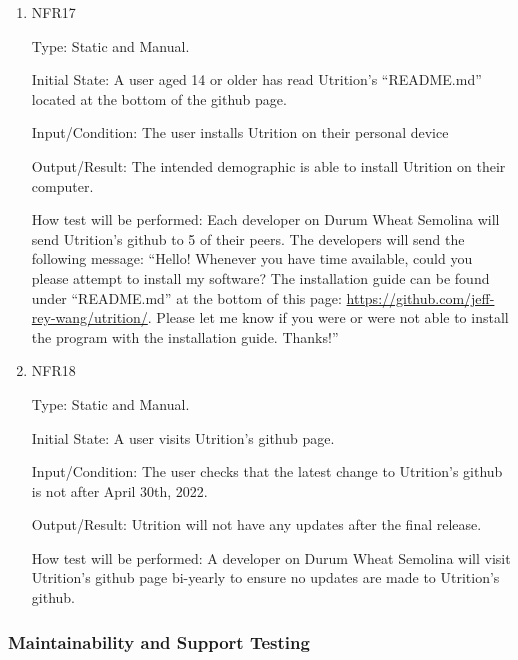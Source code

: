 \documentclass[12pt, titlepage]{article}
\begin{document}
\begin{enumerate}

\item{NFR17\\} 

Type: Static and Manual.

Initial State: A user aged 14 or older has read Utrition’s “README.md” located at the bottom of the github page.

Input/Condition: The user installs Utrition on their personal device

Output/Result: The intended demographic is able to install Utrition on their computer.

How test will be performed: Each developer on Durum Wheat Semolina will send Utrition’s github to 5 of their peers. The developers will send the following message: “Hello! Whenever you have time available, could you please attempt to install my software? The installation guide can be found under “README.md” at the bottom of this page: \href{https://github.com/jeff-rey-wang/utrition/}{https://github.com/jeff-rey-wang/utrition/}. Please let me know if you were or were not able to install the program with the installation guide. Thanks!”

\item{NFR18\\} 

Type: Static and Manual.

Initial State: A user visits Utrition’s github page.

Input/Condition: The user checks that the latest change to Utrition’s github is not after April 30th, 2022.

Output/Result: Utrition will not have any updates after the final release.

How test will be performed: A developer on Durum Wheat Semolina will visit Utrition’s github page bi-yearly to ensure no updates are made to Utrition’s github.

\end{enumerate}

\subsubsection{Maintainability and Support Testing}

\end{document}
